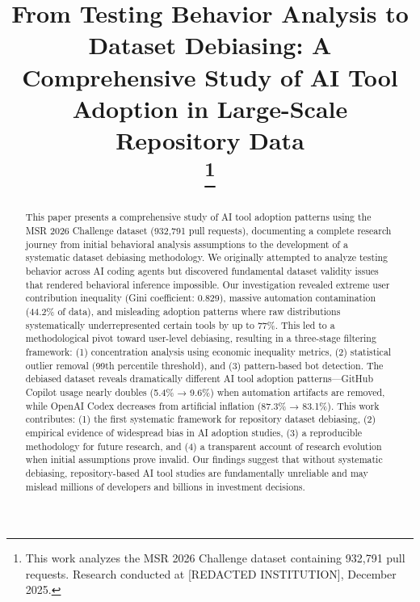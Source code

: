 \documentclass[conference]{IEEEtran}
\begin{document}
\title{From Testing Behavior Analysis to Dataset Debiasing: A Comprehensive Study of AI Tool Adoption in Large-Scale Repository Data\\
\thanks{This work analyzes the MSR 2026 Challenge dataset containing 932,791 pull requests. Research conducted at [REDACTED INSTITUTION], December 2025.}
}

\author{
}

\maketitle

\begin{abstract}
This paper presents a comprehensive study of AI tool adoption patterns using the MSR 2026 Challenge dataset (932,791 pull requests), documenting a complete research journey from initial behavioral analysis assumptions to the development of a systematic dataset debiasing methodology. We originally attempted to analyze testing behavior across AI coding agents but discovered fundamental dataset validity issues that rendered behavioral inference impossible. Our investigation revealed extreme user contribution inequality (Gini coefficient: 0.829), massive automation contamination (44.2\% of data), and misleading adoption patterns where raw distributions systematically underrepresented certain tools by up to 77\%. This led to a methodological pivot toward user-level debiasing, resulting in a three-stage filtering framework: (1) concentration analysis using economic inequality metrics, (2) statistical outlier removal (99th percentile threshold), and (3) pattern-based bot detection. The debiased dataset reveals dramatically different AI tool adoption patterns—GitHub Copilot usage nearly doubles (5.4\% → 9.6\%) when automation artifacts are removed, while OpenAI Codex decreases from artificial inflation (87.3\% → 83.1\%). This work contributes: (1) the first systematic framework for repository dataset debiasing, (2) empirical evidence of widespread bias in AI adoption studies, (3) a reproducible methodology for future research, and (4) a transparent account of research evolution when initial assumptions prove invalid. Our findings suggest that without systematic debiasing, repository-based AI tool studies are fundamentally unreliable and may mislead millions of developers and billions in investment decisions.
\end{abstract}
\end{document}
